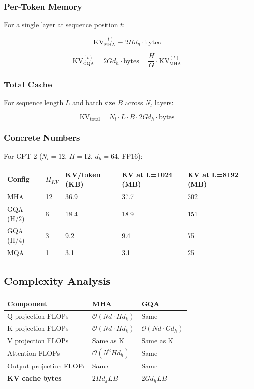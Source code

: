 \subsubsection{Per-Token Memory}

For a single layer at sequence position $t$:

\[
\text{KV}^{(t)}_\text{MHA} = 2 H d_h \cdot \text{bytes}
\tag{4.5}
\]

\[
\text{KV}^{(t)}_\text{GQA} = 2 G d_h \cdot \text{bytes} = \frac{H}{G} \cdot \text{KV}^{(t)}_\text{MHA}
\tag{4.6}
\]

\subsubsection{Total Cache}

For sequence length $L$ and batch size $B$ across $N_l$ layers:

\[
\text{KV}_\text{total} = N_l \cdot L \cdot B \cdot 2 G d_h \cdot \text{bytes}
\tag{4.7}
\]

\subsubsection{Concrete Numbers}

For GPT-2 ($N_l = 12$, $H = 12$, $d_h = 64$, FP16):

\begin{table}[H]
\centering
\small
\begin{tabular}{lllll}
\toprule
\textbf{Config} & \textbf{$H_{KV}$} & \textbf{KV/token (KB)} & \textbf{KV at L=1024 (MB)} & \textbf{KV at L=8192 (MB)} \\
\midrule
MHA & 12 & 36.9 & 37.7 & 302 \\
GQA (H/2) & 6 & 18.4 & 18.9 & 151 \\
GQA (H/4) & 3 & 9.2 & 9.4 & 75 \\
MQA & 1 & 3.1 & 3.1 & 25 \\
\bottomrule
\end{tabular}
\end{table}

\subsection{Complexity Analysis}

\begin{table}[H]
\centering
\small
\begin{tabular}{lll}
\toprule
\textbf{Component} & \textbf{MHA} & \textbf{GQA} \\
\midrule
Q projection FLOPs & $\mathcal{O}(N d \cdot H d_h)$ & Same \\
K projection FLOPs & $\mathcal{O}(N d \cdot H d_h)$ & $\mathcal{O}(N d \cdot G d_h)$ \\
V projection FLOPs & Same as K & Same as K \\
Attention FLOPs & $\mathcal{O}(N^2 H d_h)$ & Same \\
Output projection FLOPs & Same & Same \\
\textbf{KV cache bytes} & $2 H d_h L B$ & $2 G d_h L B$ \\
\bottomrule
\end{tabular}
\end{table}

